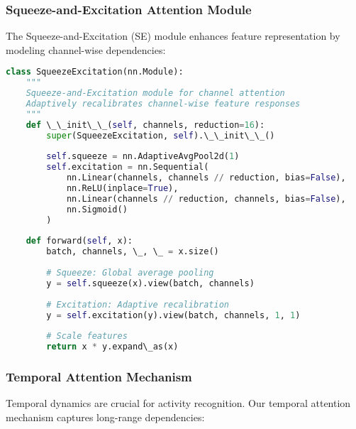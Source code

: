 \documentclass[journal]{IEEEtran}
\begin{document}
\subsubsection{Squeeze-and-Excitation Attention Module}

The Squeeze-and-Excitation (SE) module enhances feature representation by modeling channel-wise dependencies:

\begin{lstlisting}[language=Python, caption=Squeeze-and-Excitation Implementation]
class SqueezeExcitation(nn.Module):
    """
    Squeeze-and-Excitation module for channel attention
    Adaptively recalibrates channel-wise feature responses
    """
    def \_\_init\_\_(self, channels, reduction=16):
        super(SqueezeExcitation, self).\_\_init\_\_()
        
        self.squeeze = nn.AdaptiveAvgPool2d(1)
        self.excitation = nn.Sequential(
            nn.Linear(channels, channels // reduction, bias=False),
            nn.ReLU(inplace=True),
            nn.Linear(channels // reduction, channels, bias=False),
            nn.Sigmoid()
        )
        
    def forward(self, x):
        batch, channels, \_, \_ = x.size()
        
        # Squeeze: Global average pooling
        y = self.squeeze(x).view(batch, channels)
        
        # Excitation: Adaptive recalibration
        y = self.excitation(y).view(batch, channels, 1, 1)
        
        # Scale features
        return x * y.expand\_as(x)
\end{lstlisting}

\subsubsection{Temporal Attention Mechanism}

Temporal dynamics are crucial for activity recognition. Our temporal attention mechanism captures long-range dependencies:
\end{document}
